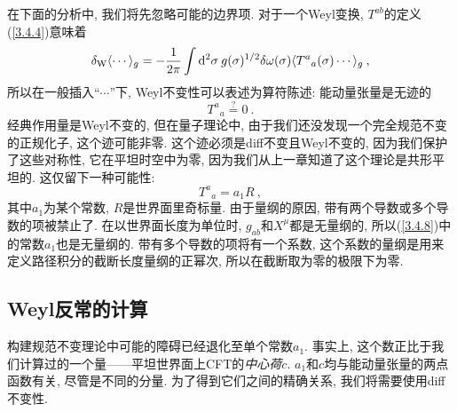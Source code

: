 在下面的分析中, 我们将先忽略可能的边界项. 对于一个Weyl变换, $T^{ab}$的定义(\ref{3.4.4})意味着
\begin{equation}\label{3.4.6}
\delta_{\mathrm{W}}\langle\cdots\rangle_{g}=-\frac{1}{2 \pi} \int \mathrm{d}^{2} \sigma\: g(\sigma)^{1 / 2} \delta \omega(\sigma)\langle T^{a}{}_{a}(\sigma) \cdots\rangle_{g} \:,
\end{equation}
所以在一般插入“$\cdots$”下, Weyl不变性可以表述为算符陈述: 能动量张量是无迹的
\begin{equation}
{T^a}_{a} \stackrel{?}{=} 0 \:. \label{3.4.7}
\end{equation}
经典作用量是Weyl不变的, 但在量子理论中, 由于我们还没发现一个完全规范不变的正规化子, 这个迹可能非零. 这个迹必须是diff不变且Weyl不变的, 因为我们保护了这些对称性, 它在平坦时空中为零, 因为我们从上一章知道了这个理论是共形平坦的. 这仅留下一种可能性: 
\begin{equation}\label{3.4.8}
T^{a}{}_{a}=a_{1} R \:,
\end{equation}
其中$a_{1}$为某个常数, $R$是世界面里奇标量. 由于量纲的原因, 带有两个导数或多个导数的项被禁止了. 在以世界面长度为单位时, $g_{ab}$和$X^\mu$都是无量纲的, 
所以(\ref{3.4.8})中的常数$a_1$也是无量纲的. 带有多个导数的项将有一个系数, 这个系数的量纲是用来定义路径积分的截断长度量纲的正幂次, 所以在截断取为零的极限下为零.

\subsection*{Weyl反常的计算}

构建规范不变理论中可能的障碍已经退化至单个常数$a_1$. 事实上, 这个数正比于我们计算过的一个量——平坦世界面上CFT的\emph{中心荷}$c$. $a_1$和$c$均与能动量张量的两点函数有关, 尽管是不同的分量. 为了得到它们之间的精确关系, 我们将需要使用diff不变性. 

